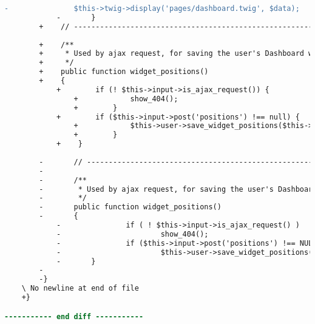 \begin{lstlisting}[language=diff, caption=Perubahan pada kode Dashboard.php]
			-               $this->twig->display('pages/dashboard.twig', $data);
			-       }
		+    // ------------------------------------------------------------------------
		
		+    /**
		+     * Used by ajax request, for saving the user's Dashboard widget positions
		+     */
		+    public function widget_positions()
		+    {
			+        if (! $this->input->is_ajax_request()) {
				+            show_404();
				+        }
			+        if ($this->input->post('positions') !== null) {
				+            $this->user->save_widget_positions($this->input->post('positions'));
				+        }
			+    }
		
		-       // ------------------------------------------------------------------------
		-
		-       /**
		-        * Used by ajax request, for saving the user's Dashboard widget positions
		-        */
		-       public function widget_positions()
		-       {
			-               if ( ! $this->input->is_ajax_request() )
			-                       show_404();
			-               if ($this->input->post('positions') !== NULL)
			-                       $this->user->save_widget_positions($this->input->post('positions'));
			-       }
		-
		-}
	\ No newline at end of file
	+}

----------- end diff -----------
\end{lstlisting}

